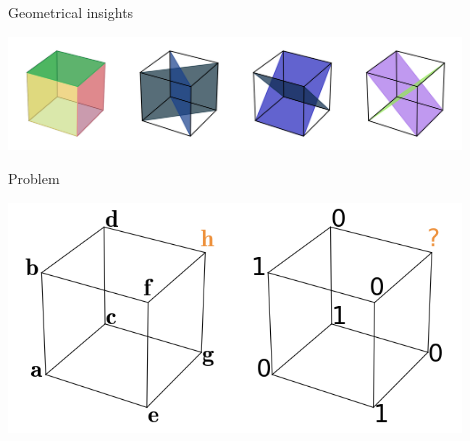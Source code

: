 \documentclass{beamer}
\begin{document}
\begin{frame}{Geometrical insights}
  \begin{center}
    \includegraphics[width=0.9\textwidth]{figures/cubes_in_B3_pres.png}
  \end{center}
\end{frame}

\begin{frame}{Problem}
  \begin{center}
    \includegraphics[width=0.9\textwidth]{figures/classification_problem_pres.png}
  \end{center}
\end{frame}
\end{document}
